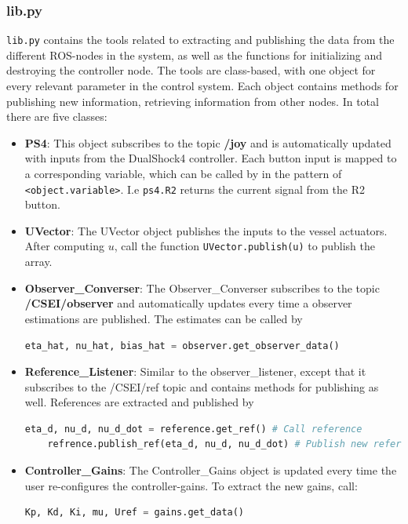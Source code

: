 \subsubsection{lib.py}
\lstinline{lib.py} contains the tools related to extracting and publishing the data from the different ROS-nodes in the system, as well as the functions for initializing and destroying the controller node. The tools are class-based, with one object for every relevant parameter in the control system. Each object contains methods for publishing new information, retrieving information from other nodes. In total there are five classes:
\begin{itemize}
    \item \textbf{PS4}: This object subscribes to the topic \textbf{/joy} and is automatically updated with inputs from the DualShock4 controller. Each button input is mapped to a corresponding variable, which can be called by in the pattern of \lstinline{<object.variable>}. I.e \lstinline{ps4.R2} returns the current signal from the R2 button.
    \item \textbf{UVector}:
    The UVector object publishes the inputs to the vessel actuators. After computing $u$, call the function \lstinline{UVector.publish(u)} to publish the array.
    \item \textbf{Observer\_Converser}:
    The Observer\_Converser subscribes to the topic \textbf{/CSEI/observer} and automatically updates every time a observer estimations are published. The estimates can be called by 
    \begin{lstlisting}[language=python,basicstyle=\mlttfamily, breaklines=true]
    eta_hat, nu_hat, bias_hat = observer.get_observer_data()
    \end{lstlisting}
    \item \textbf{Reference\_Listener}:
    Similar to the observer\_listener, except that it subscribes to the /CSEI/ref topic and contains methods for publishing as well. References are extracted and published by
     \begin{lstlisting}[language=python,basicstyle=\mlttfamily, breaklines=true]
    eta_d, nu_d, nu_d_dot = reference.get_ref() # Call reference
    refrence.publish_ref(eta_d, nu_d, nu_d_dot) # Publish new reference
    \end{lstlisting}
    \item \textbf{Controller\_Gains}:
    The Controller\_Gains object is updated every time the user re-configures the controller-gains. To extract the new gains, call:
     \begin{lstlisting}[language=python,basicstyle=\mlttfamily, breaklines=true]
    Kp, Kd, Ki, mu, Uref = gains.get_data()
    \end{lstlisting}
\end{itemize}

